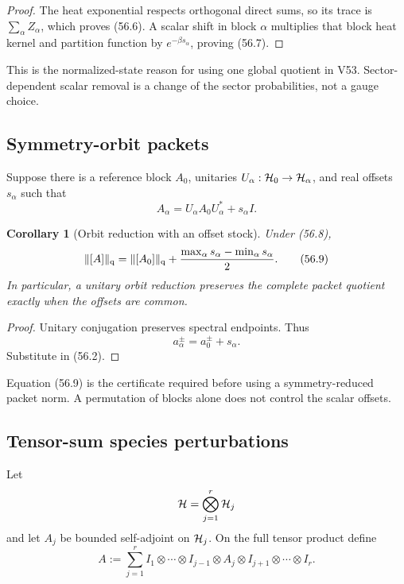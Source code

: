\documentclass[11pt]{article}
\newtheorem{corollary}[theorem]{Corollary}
\theoremstyle{remark}
\begin{document}
\begin{proof}
The heat exponential respects orthogonal direct sums, so its trace is
\(\sum_\alpha Z_\alpha\), which proves (56.6).  A scalar shift in
block \(\alpha\) multiplies that block heat kernel and partition
function by \(e^{-\beta s_\alpha}\), proving (56.7).
\end{proof}

This is the normalized-state reason for using one global quotient in
V53.  Sector-dependent scalar removal is a change of the sector
probabilities, not a gauge choice.

\subsection{Symmetry-orbit packets}

Suppose there is a reference block \(A_0\), unitaries
\(U_\alpha:{\cal H}_0\to{\cal H}_\alpha\), and real offsets
\(s_\alpha\) such that
\begin{equation}
 A_\alpha=U_\alpha A_0U_\alpha^*+s_\alpha I.       \tag{56.8}
\end{equation}

\begin{corollary}[Orbit reduction with an offset stock]
\label{cor:v12v56-orbit}
Under (56.8),
\begin{equation}
 \|[A]\|_{\rm q}
 =
 \|[A_0]\|_{\rm q}
 +
 {\max_\alpha s_\alpha-\min_\alpha s_\alpha\over2}.           \tag{56.9}
\end{equation}
In particular, a unitary orbit reduction preserves the complete
packet quotient exactly when the offsets are common.
\end{corollary}

\begin{proof}
Unitary conjugation preserves spectral endpoints.  Thus
\[
 a_\alpha^\pm=a_0^\pm+s_\alpha.
\]
Substitute in (56.2).
\end{proof}

Equation (56.9) is the certificate required before using a
symmetry-reduced packet norm.  A permutation of blocks alone does not
control the scalar offsets.

\subsection{Tensor-sum species perturbations}

Let
\[
 {\cal H}=\bigotimes_{j=1}^r{\cal H}_j
\]
and let \(A_j\) be bounded self-adjoint on \({\cal H}_j\).  On the
full tensor product define
\begin{equation}
 A
 :=
 \sum_{j=1}^r
 I_1\otimes\cdots\otimes I_{j-1}\otimes A_j
 \otimes I_{j+1}\otimes\cdots\otimes I_r.         \tag{56.10}
\end{equation}
\end{document}
